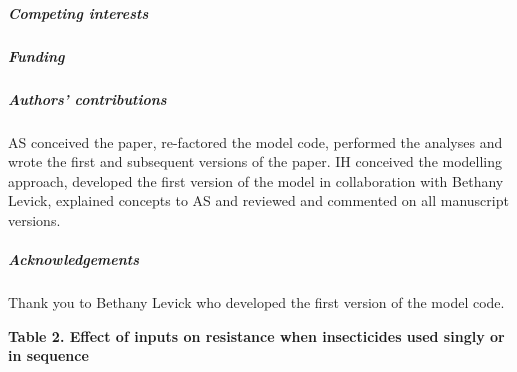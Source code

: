 \documentclass[11pt,]{article}
\let\oldsubparagraph\subparagraph
\renewcommand{\subparagraph}[1]{\oldsubparagraph{#1}\mbox{}}
\begin{document}
\subparagraph{Competing interests}\label{competing-interests}

\subparagraph{Funding}\label{funding}

\subparagraph{Authors' contributions}\label{authors-contributions}

AS conceived the paper, re-factored the model code, performed the
analyses and wrote the first and subsequent versions of the paper. IH
conceived the modelling approach, developed the first version of the
model in collaboration with Bethany Levick, explained concepts to AS and
reviewed and commented on all manuscript versions.

\subparagraph{Acknowledgements}\label{acknowledgements}

Thank you to Bethany Levick who developed the first version of the model
code.

\pagebreak

\textbf{Table 2. Effect of inputs on resistance when insecticides used
singly or in sequence}
\end{document}

